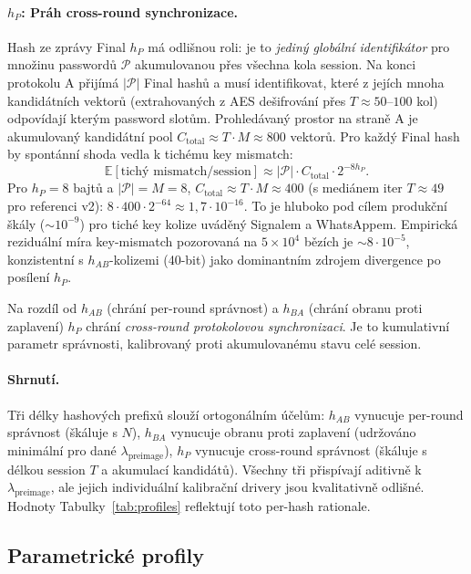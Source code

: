 \documentclass[11pt,a4paper]{article}
\begin{document}
\paragraph{$h_P$: Práh cross-round synchronizace.} Hash ze zprávy Final $h_P$ má odlišnou roli: je to \emph{jediný globální identifikátor} pro množinu passwordů $\mathcal{P}$ akumulovanou přes všechna kola session. Na konci protokolu A přijímá $|\mathcal{P}|$ Final hashů a musí identifikovat, které z jejích mnoha kandidátních vektorů (extrahovaných z AES dešifrování přes $T \approx 50$--$100$ kol) odpovídají kterým password slotům. Prohledávaný prostor na straně A je akumulovaný kandidátní pool $C_\text{total} \approx T \cdot M \approx 800$ vektorů. Pro každý Final hash by spontánní shoda vedla k tichému key mismatch:
\[
\mathbb{E}[\text{tichý mismatch}/\text{session}] \approx |\mathcal{P}| \cdot C_\text{total} \cdot 2^{-8 h_P}.
\]
Pro $h_P = 8$ bajtů a $|\mathcal{P}| = M = 8$, $C_\text{total} \approx T \cdot M \approx 400$ (s mediánem iter $T \approx 49$ pro referenci v2): $8 \cdot 400 \cdot 2^{-64} \approx 1{,}7 \cdot 10^{-16}$. To je hluboko pod cílem produkční škály ($\sim 10^{-9}$) pro tiché key kolize uváděný Signalem a WhatsAppem. Empirická reziduální míra key-mismatch pozorovaná na $5 \times 10^4$ bězích je $\sim 8 \cdot 10^{-5}$, konzistentní s $h_{AB}$-kolizemi (40-bit) jako dominantním zdrojem divergence po posílení $h_P$.

Na rozdíl od $h_{AB}$ (chrání per-round správnost) a $h_{BA}$ (chrání obranu proti zaplavení) $h_P$ chrání \emph{cross-round protokolovou synchronizaci}. Je to kumulativní parametr správnosti, kalibrovaný proti akumulovanému stavu celé session.

\paragraph{Shrnutí.} Tři délky hashových prefixů slouží ortogonálním účelům: $h_{AB}$ vynucuje per-round správnost (škáluje s $N$), $h_{BA}$ vynucuje obranu proti zaplavení (udržováno minimální pro dané $\lambda_\text{preimage}$), $h_P$ vynucuje cross-round správnost (škáluje s délkou session $T$ a akumulací kandidátů). Všechny tři přispívají aditivně k $\lambda_\text{preimage}$, ale jejich individuální kalibrační drivery jsou kvalitativně odlišné. Hodnoty Tabulky~\ref{tab:profiles} reflektují toto per-hash rationale.

\subsection{Parametrické profily}\label{sec:profiles}
\end{document}
